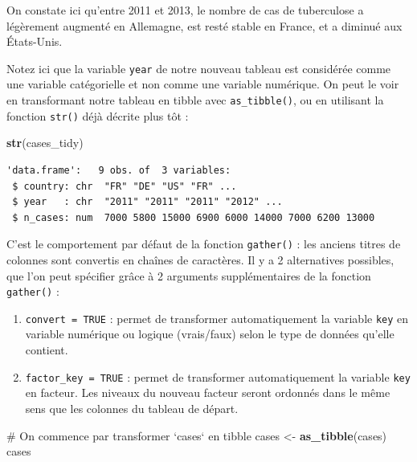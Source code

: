 \documentclass[a4paperpaper,]{article}
\newenvironment{Shaded}{\begin{snugshade}}{\end{snugshade}}
\newcommand{\CommentTok}[1]{\textcolor[rgb]{0.54,0.53,0.53}{#1}}
\newcommand{\KeywordTok}[1]{\textcolor[rgb]{0.12,0.11,0.11}{\textbf{#1}}}
\newcommand{\NormalTok}[1]{\textcolor[rgb]{0.12,0.11,0.11}{#1}}
\newcommand{\StringTok}[1]{\textcolor[rgb]{0.75,0.01,0.01}{#1}}
\providecommand{\tightlist}{%
  \setlength{\itemsep}{0pt}\setlength{\parskip}{0pt}}
\begin{document}
On constate ici qu'entre 2011 et 2013, le nombre de cas de tuberculose a légèrement augmenté en Allemagne, est resté stable en France, et a diminué aux États-Unis.

Notez ici que la variable \texttt{year} de notre nouveau tableau est considérée comme une variable catégorielle et non comme une variable numérique. On peut le voir en transformant notre tableau en tibble avec \texttt{as\_tibble()}, ou en utilisant la fonction \texttt{str()} déjà décrite plus tôt :

\begin{Shaded}
\begin{Highlighting}[]
\KeywordTok{str}\NormalTok{(cases_tidy)}
\end{Highlighting}
\end{Shaded}

\begin{verbatim}
'data.frame':   9 obs. of  3 variables:
 $ country: chr  "FR" "DE" "US" "FR" ...
 $ year   : chr  "2011" "2011" "2011" "2012" ...
 $ n_cases: num  7000 5800 15000 6900 6000 14000 7000 6200 13000
\end{verbatim}

C'est le comportement par défaut de la fonction \texttt{gather()} : les anciens titres de colonnes sont convertis en chaînes de caractères. Il y a 2 alternatives possibles, que l'on peut spécifier grâce à 2 arguments supplémentaires de la fonction \texttt{gather()} :

\begin{enumerate}
\def\labelenumi{\arabic{enumi}.}
\tightlist
\item
  \texttt{convert\ =\ TRUE} : permet de transformer automatiquement la variable \texttt{key} en variable numérique ou logique (vrais/faux) selon le type de données qu'elle contient.
\item
  \texttt{factor\_key\ =\ TRUE} : permet de transformer automatiquement la variable \texttt{key} en facteur. Les niveaux du nouveau facteur seront ordonnés dans le même sens que les colonnes du tableau de départ.
\end{enumerate}

\begin{Shaded}
\begin{Highlighting}[]
\CommentTok{# On commence par transformer `cases` en tibble}
\NormalTok{cases <-}\StringTok{ }\KeywordTok{as_tibble}\NormalTok{(cases)}
\NormalTok{cases}
\end{Highlighting}
\end{Shaded}
\end{document}
